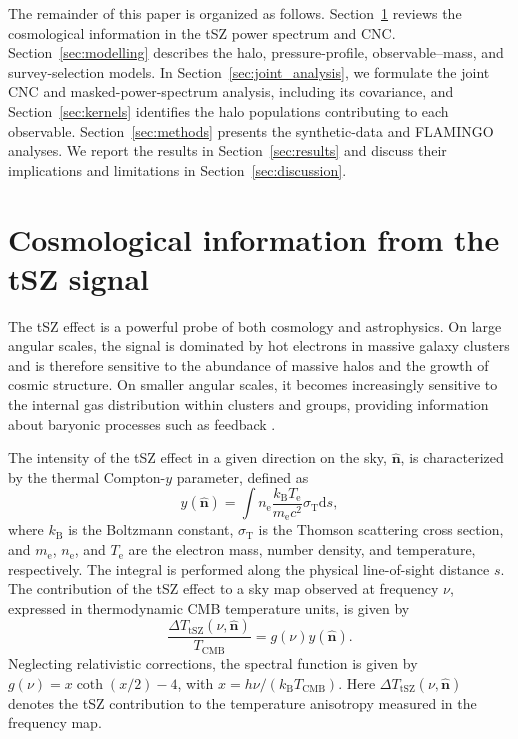 \documentclass[aps,prd,twocolumn,superscriptaddress,nofootinbib,floatfix]{revtex4-2}
\begin{document}
The remainder of this paper is organized as follows. Section~\ref{sec:theory} reviews the cosmological information in the tSZ power spectrum and CNC. Section~\ref{sec:modelling} describes the halo, pressure-profile, observable--mass, and survey-selection models. In Section~\ref{sec:joint_analysis}, we formulate the joint CNC and masked-power-spectrum analysis, including its covariance, and Section~\ref{sec:kernels} identifies the halo populations contributing to each observable. Section~\ref{sec:methods} presents the synthetic-data and FLAMINGO analyses. We report the results in Section~\ref{sec:results} and discuss their implications and limitations in Section~\ref{sec:discussion}.


\section{Cosmological information from the tSZ signal}
\label{sec:theory}
The tSZ effect is a powerful probe of both cosmology and astrophysics. On large angular scales, the signal is dominated by hot electrons in massive galaxy clusters and is therefore sensitive to the abundance of massive halos and the growth of cosmic structure. On smaller angular scales, it becomes increasingly sensitive to the internal gas distribution within clusters and groups, providing information about baryonic processes such as feedback \citep{Carlstrom2002,HillPajer2013}.

The intensity of the tSZ effect in a given direction on the sky, $\hat{\bm{n}}$, is characterized by the thermal Compton-$y$ parameter, defined as
\begin{equation}
y(\hat{\bm{n}})
=
\int
n_{\mathrm{e}}
\frac{k_{\mathrm{B}}T_{\mathrm{e}}}{m_{\mathrm{e}}c^2}
\sigma_{\mathrm{T}}
\mathrm{d}s,
\label{eq:compton_y}
\end{equation}
where $k_{\mathrm{B}}$ is the Boltzmann constant, $\sigma_{\mathrm{T}}$ is the Thomson scattering cross section, and $m_{\mathrm{e}}$, $n_{\mathrm{e}}$, and $T_{\mathrm{e}}$ are the electron mass, number density, and temperature, respectively. The integral is performed along the physical line-of-sight distance $s$. The contribution of the tSZ effect to a sky map observed at frequency $\nu$, expressed in thermodynamic CMB temperature units, is given by
\begin{equation}
\frac{\Delta T_{\mathrm{tSZ}}(\nu,\hat{\bm{n}})}
{T_{\mathrm{CMB}}}
=
g(\nu)y(\hat{\bm{n}}).
\label{eq:tsz_temperature}
\end{equation}
Neglecting relativistic corrections, the spectral function is given by $g(\nu)=x\coth(x/2)-4$, with $x=h\nu/(k_{\mathrm{B}}T_{\mathrm{CMB}})$. Here $\Delta T_{\mathrm{tSZ}}(\nu,\hat{\bm{n}})$ denotes the tSZ contribution to the temperature anisotropy measured in the frequency map.
\end{document}
